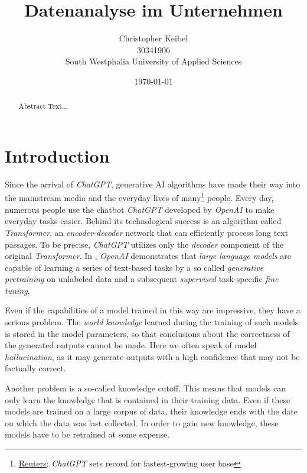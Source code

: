 \documentclass{article}
\title{Datenanalyse im Unternehmen}
\author{Christopher Keibel \\ 30341906 \\South Westphalia University of Applied Sciences }
\date{\today}
\begin{document}
\maketitle

\begin{abstract}
    Abstract Text...
\end{abstract}

\section{Introduction}
Since the arrival of \textit{ChatGPT}, generative AI algorithms have made their way into the mainstream media and the everyday lives of many\footnote{\href{https://www.reuters.com/technology/chatgpt-sets-record-fastest-growing-user-base-analyst-note-2023-02-01/}{Reuters}: \textit{ChatGPT} sets record for fastest-growing user base} people. Every day, numerous people use the chatbot \textit{ChatGPT} developed by \textit{OpenAI} to make everyday tasks easier. Behind its technological success is an algorithm called \textit{Transformer}\cite{attentionIsAllYouNeed}, an \textit{encoder-decoder} network that can efficiently process long text passages. To be precise, \textit{ChatGPT} utilizes only the \textit{decoder}\cite{GPT} component of the original \textit{Transformer}.
In \cite{GPT}, \textit{OpenAI} demonstrates that \textit{large language models} are capable of learning a series of text-based tasks by a so called \textit{generative pretraining} on unlabeled data and a subsequent \textit{supervised} task-specific \textit{fine tuning}.

Even if the capabilities of a model trained in this way are impressive, they have a serious problem. The \textit{world knowledge} learned during the training of such models is stored in the model parameters\cite{RAG}, so that conclusions about the correctness of the generated outputs cannot be made. Here we often speak of model \textit{hallucination}, as it may generate outputs with a high confidence that may not be factually correct.

Another problem is a so-called knowledge cutoff. This means that models can only learn the knowledge that is contained in their training data. Even if these models are trained on a large corpus of data, their knowledge ends with the date on which the data was last collected. In order to gain new knowledge, these models have to be retrained at some expense.
\end{document}
